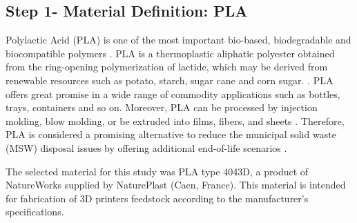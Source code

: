 \subsection{Step 1- Material Definition: PLA}
\label{Subsection.material.definition}

Polylactic Acid (PLA) is one of the most important bio-based, biodegradable and biocompatible polymers \parencite{Drumright2000,Mohanty2000,Henton2005,Luckachan2011, Soroudi2013}. 
PLA is a thermoplastic aliphatic polyester obtained from the ring-opening polymerization of lactide, which may be derived from  renewable resources such as potato, starch, sugar cane and corn sugar. \parencite{Agrawal2003,Hamad2013, Castro-Aguirre2016}.
PLA offers great promise in a wide range of commodity applications such as bottles, trays, containers and so on. 
Moreover, PLA can be processed by injection molding, blow molding, or be extruded into films, fibers, and sheets
\parencite{Drumright2000,Auras2010, Gupta2007,Lim2008,Lim2010}. 
Therefore, PLA is considered a promising alternative to reduce the municipal solid waste (MSW) disposal issues by offering additional end-of-life scenarios \parencite{Ren2011, Mohanty2002,Mohanty2000,Soroudi2013}. 

The selected material for this study was PLA type 4043D, a product of NatureWorks supplied by NaturePlast (Caen, France). 
This material is intended for fabrication of 3D printers feedstock according to the manufacturer's specifications.


